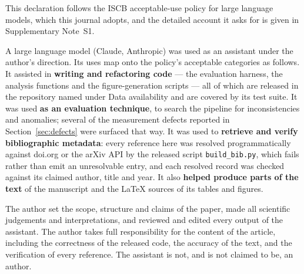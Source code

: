 \documentclass[11pt]{article}
\begin{document}
This declaration follows the ISCB acceptable-use policy for large language
models, which this journal adopts, and the detailed account it asks for is given
in Supplementary Note~S1.

A large language model (Claude, Anthropic) was used as an assistant under the
author's direction. Its uses map onto the policy's acceptable categories as
follows. It assisted in \textbf{writing and refactoring code} --- the evaluation
harness, the analysis functions and the figure-generation scripts --- all of which
are released in the repository named under Data availability and are covered by
its test suite. It was used \textbf{as an evaluation technique}, to search the
pipeline for inconsistencies and anomalies; several of the measurement defects
reported in Section~\ref{sec:defects} were surfaced that way. It was used to
\textbf{retrieve and verify bibliographic metadata}: every reference here was
resolved programmatically against doi.org or the arXiv API by the released script
\texttt{build\_bib.py}, which fails rather than emit an unresolvable entry, and
each resolved record was checked against its claimed author, title and year. It
also \textbf{helped produce parts of the text} of the manuscript and the \LaTeX{}
sources of its tables and figures.

The author set the scope, structure and claims of the paper, made all scientific
judgements and interpretations, and reviewed and edited every output of the
assistant. The author takes full responsibility for the content of the article,
including the correctness of the released code, the accuracy of the text, and the
verification of every reference. The assistant is not, and is not claimed to be,
an author.



\end{document}
